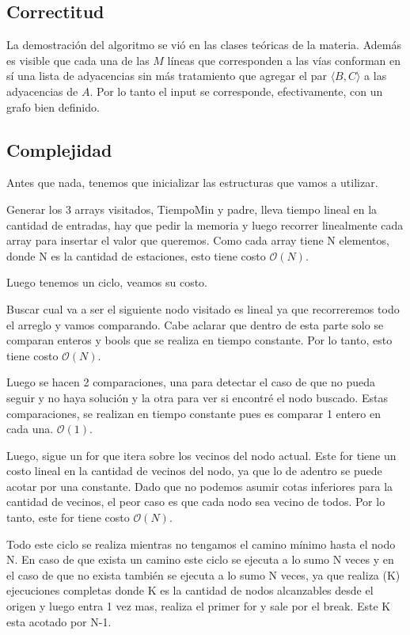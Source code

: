 \subsection{Correctitud}

La demostración del algoritmo se vió en las clases teóricas de la materia. Además es visible que cada una de las $M$ líneas que corresponden a las vías conforman en sí una lista de adyacencias sin más tratamiento que agregar el par $\langle B,C \rangle$ a las adyacencias de $A$. Por lo tanto el input se corresponde, efectivamente, con un grafo bien definido.

\subsection{Complejidad}
Antes que nada, tenemos que inicializar las estructuras que vamos a utilizar.

Generar los 3 arrays visitados, TiempoMin y padre, lleva tiempo lineal en la cantidad de entradas, hay que pedir la memoria y luego recorrer linealmente cada array para insertar el valor que queremos. Como cada array tiene N elementos, donde N es la cantidad de estaciones, esto tiene costo $\mathcal{O}(N)$.

Luego tenemos un ciclo,  veamos su costo.

Buscar cual va a ser el siguiente nodo visitado es lineal ya que  recorreremos  todo el arreglo y vamos  comparando. Cabe aclarar que dentro de esta parte solo se comparan enteros y bools que se realiza en tiempo constante. Por lo tanto, esto tiene costo $\mathcal{O}(N)$.

Luego se hacen 2 comparaciones, una para detectar el caso de que no pueda seguir y no haya solución y la otra para ver si encontré el nodo buscado. Estas comparaciones, se realizan en tiempo constante pues es comparar 1 entero en cada una. $\mathcal{O}(1)$.

Luego, sigue un for que itera sobre los vecinos del nodo actual. Este for tiene un costo lineal en la cantidad de vecinos del nodo, ya que lo de adentro se puede acotar por una constante. Dado que no podemos asumir cotas inferiores para la cantidad de vecinos, el peor caso es que cada nodo sea vecino de todos. Por lo tanto, este for tiene costo $\mathcal{O}(N)$.

Todo este ciclo se realiza mientras no tengamos el camino mínimo hasta el nodo N.  En caso de que exista un camino este ciclo se ejecuta a lo sumo N veces y en el caso de que no exista también se ejecuta a lo sumo N veces, ya que realiza (K) ejecuciones completas donde K es la cantidad de nodos alcanzables desde el origen y luego entra 1 vez mas, realiza el primer for y sale por el break. Este K esta acotado por N-1.

